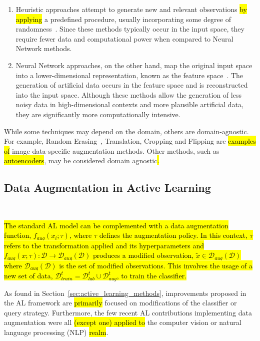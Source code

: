 \documentclass[preprint, 12pt]{elsarticle}
\begin{document}
\begin{enumerate}
    \item Heuristic approaches attempt to generate new and relevant
        observations \hl{by applying} a predefined procedure,
        usually incorporating some degree of randomness~\cite{Kashefi2020}.
        Since these methods typically occur in the input space, they require
        fewer data and computational power when compared to Neural Network
        methods. 
    \item Neural Network approaches, on the other hand, map the original input
        space into a lower-dimensional representation, known as the feature
        space~\cite{DeVries2017}. The generation of artificial data occurs in
        the feature space and is reconstructed into the input space. Although
        these methods allow the generation of less noisy data in
        high-dimensional contexts and more plausible artificial data, they are
        significantly more computationally intensive. 
\end{enumerate}

While some techniques may depend on the domain, others are domain-agnostic.
For example, Random Erasing~\cite{Zhong2020}, Translation, Cropping and
Flipping are \hl{examples of} image data-specific augmentation methods. Other
methods, such as \hl{autoencoders}, may be considered domain agnostic\hl{.}

\subsection{Data Augmentation in Active Learning
}~\label{sec:data_augmentation_in_al}

\hl{The standard AL model can be complemented with a data augmentation
function, $f_{aug}(x_i;\tau)$, where $\tau$ defines the augmentation policy.
In this context, $\tau$ refers to the transformation applied and its
hyperparameters and $f_{aug}(x;\tau): \mathcal{D} \rightarrow
\mathcal{D}_{aug}(\mathcal{D})$ produces a modified observation,
$\tilde{x} \in \mathcal{D}_{aug}(\mathcal{D})$ where
$\mathcal{D}_{aug}(\mathcal{D})$ is the set of modified observations. This
involves the usage of a new set of data, $\mathcal{D}_{train}^t =
\mathcal{D}_{lab}^t \cup \mathcal{D}_{aug}^t$, to train the classifier.}


As found in Section~\ref{sec:active_learning_methods}, improvements proposed
in the AL framework are \hl{primarily} focused on modifications of the
classifier or query strategy. Furthermore, the few recent AL contributions
implementing data augmentation were all \hl{(except one) applied to} the
computer vision or natural language processing (NLP) \hl{realm}. 
\end{document}
